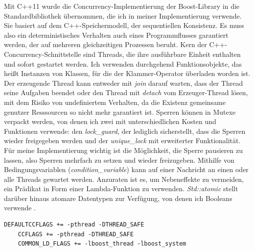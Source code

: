 \documentclass[a4paper,12pt,twoside]{article}
\newcommand{\Fb}[1]{\textit{#1}} %
\begin{document}
Mit C++11 wurde die Concurrency-Implementierung der Boost-Library in die Standardbibliothek übernommen, die ich in meiner Implementierung verwende. Sie basiert auf dem C++-Speichermodell, der sequentiellen Konsistenz. Es muss also ein deterministisches Verhalten auch eines Programmflusses garantiert werden, der auf mehreren gleichzeitigen Prozessen beruht. Kern der C++-Concurrency-Schnittstelle sind Threads, die ihre ausführbare Einheit enthalten und sofort gestartet werden. Ich verwenden durchgehend Funktionsobjekte, das heißt Instanzen von Klassen, für die der Klammer-Operator überladen worden ist. Der erzeugende Thread kann entweder mit \Fb{join} darauf warten, dass der Thread seine Aufgaben beendet oder den Thread mit \Fb{detach} vom Erzeuger-Thread lösen, mit dem Risiko von undefiniertem Verhalten, da die Existenz gemeinsame genutzer Resssourcen so nicht mehr garantiert ist. Sperren können in Mutexe verpackt werden, von denen ich zwei mit unterschiedlichen Kosten und Funktionen verwende: den \Fb{lock\_guard}, der lediglich sicherstellt, dass die Sperren wieder freigegeben werden und der \Fb{unique\_lock} mit erweiterter Funktionalität. Für meine Implementierung wichtig ist die Möglichkeit, die Sperre pausieren zu lassen, also Sperren mehrfach zu setzen und wieder freizugeben. Mithilfe von Bedingungsvariablen (\Fb{condition\_variable}) kann auf einer Nachricht an einen oder alle Threads gewartet werden. Anzuraten ist es, um Nebeneffekte zu vermeiden, ein Prädikat in Form einer Lambda-Funktion zu verwenden. \Fb{Std::atomic} stellt darüber hinaus atomare Datentypen zur Verfügung, von denen ich Booleans verwende {\autocite{Grimm2018}}. 

\begin{minipage}{\linewidth}
	\begin{lstlisting}[caption={Flags der MThreaded-Algebra}, label=list:flags]
	DEFAULTCCFLAGS += -pthread -DTHREAD_SAFE
	CCFLAGS += -pthread -DTHREAD_SAFE
	COMMON_LD_FLAGS += -lboost_thread -lboost_system
	\end{lstlisting}
\end{minipage}
\end{document}
